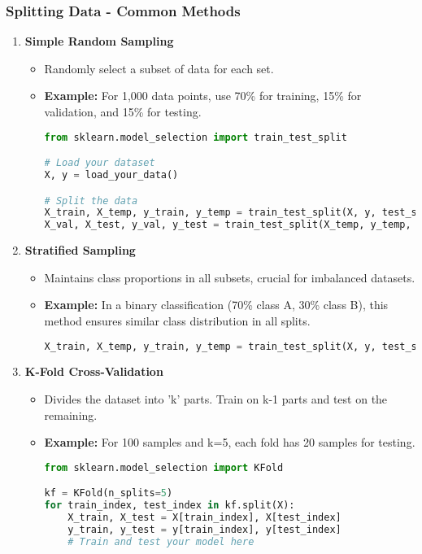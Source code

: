 \documentclass[aspectratio=169]{beamer}
\begin{document}
\begin{frame}[fragile]
    \frametitle{Splitting Data - Common Methods}
    \begin{enumerate}
        \item \textbf{Simple Random Sampling}
        \begin{itemize}
            \item Randomly select a subset of data for each set.
            \item \textbf{Example:} For 1,000 data points, use 70\% for training, 15\% for validation, and 15\% for testing.
            \begin{lstlisting}[language=Python]
from sklearn.model_selection import train_test_split

# Load your dataset
X, y = load_your_data()

# Split the data
X_train, X_temp, y_train, y_temp = train_test_split(X, y, test_size=0.3, random_state=42)
X_val, X_test, y_val, y_test = train_test_split(X_temp, y_temp, test_size=0.5, random_state=42)
            \end{lstlisting}
        \end{itemize}
        
        \item \textbf{Stratified Sampling}
        \begin{itemize}
            \item Maintains class proportions in all subsets, crucial for imbalanced datasets.
            \item \textbf{Example:} In a binary classification (70\% class A, 30\% class B), this method ensures similar class distribution in all splits.
            \begin{lstlisting}[language=Python]
X_train, X_temp, y_train, y_temp = train_test_split(X, y, test_size=0.3, stratify=y, random_state=42)
            \end{lstlisting}
        \end{itemize}
        
        \item \textbf{K-Fold Cross-Validation}
        \begin{itemize}
            \item Divides the dataset into 'k' parts. Train on k-1 parts and test on the remaining.
            \item \textbf{Example:} For 100 samples and k=5, each fold has 20 samples for testing.
            \begin{lstlisting}[language=Python]
from sklearn.model_selection import KFold

kf = KFold(n_splits=5)
for train_index, test_index in kf.split(X):
    X_train, X_test = X[train_index], X[test_index]
    y_train, y_test = y[train_index], y[test_index]
    # Train and test your model here
            \end{lstlisting}
        \end{itemize}
    \end{enumerate}
\end{frame}
\end{document}
